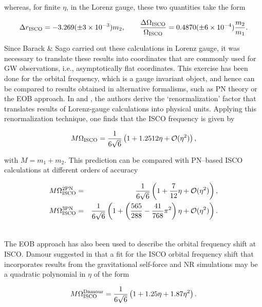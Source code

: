 \noindent whereas, for finite \(\eta\), in the Lorenz gauge, these two quantities take the form~\cite{inner} 

\begin{equation}
\Delta r_{\rm ISCO} = -3.269(\pm3\times10^{-3}) m_2,  \qquad \frac{\Delta\Omega_{\rm ISCO}}{\Omega_{\rm ISCO}} = 0.4870(\pm6\times10^{-4})\frac{m_2}{m_1}.
\label{shift}
\end{equation}

Since Barack \& Sago carried out these calculations in Lorenz gauge, it was necessary to translate these results into coordinates that are commonly used for GW observations, i.e., asymptotically flat coordinates.  This exercise has been done for the orbital frequency, which is a gauge invariant object, and hence can be compared to results obtained in alternative formalisms, such as PN theory or the EOB approach.  In \cite{baracknewphi} and \cite{damsh}, the authors derive the `renormalization' factor that translates results of Lorenz-gauge calculations into  physical units. Applying this renormalization technique, one finds that the ISCO frequency is given by  

\begin{equation}
M\Omega_{\rm ISCO} = \frac{1}{6\sqrt{6}}\left(1+1.2512\eta + {\cal{O}}(\eta^2)\right),
\label{bsshift}
\end{equation}

\noindent with \(M=m_1+m_2\). This prediction can be compared with PN--based ISCO calculations at different orders of accuracy \cite{favata}

\begin{eqnarray}
M\Omega^{2{\rm PN}}_{\rm ISCO} &=&\frac{1}{6\sqrt{6}}\left(1+\frac{7}{12}\eta + {\cal{O}}(\eta^2)\right), \\\nonumber
M\Omega^{3{\rm PN}}_{\rm ISCO} &=&\frac{1}{6\sqrt{6}}\left(1+ \left(\frac{565}{288} - \frac{41}{768}\pi^2\right)\eta + {\cal{O}}(\eta^2)\right). \\\nonumber
\label{pnshift}
\end{eqnarray}

\noindent The EOB approach has also been used to describe the orbital frequency shift at ISCO. Damour suggested in \cite{damsh} that a fit for the ISCO orbital frequency shift that incorporates results from the gravitational self-force and NR simulations may be a quadratic polynomial in \(\eta\) of the form \cite{damsh} 

\begin{equation}
M\Omega^{\rm Damour}_{\rm ISCO} = \frac{1}{6\sqrt{6}}\left(1+1.25\eta + 1.87\eta^2\right).
\label{damshift}
\end{equation}


